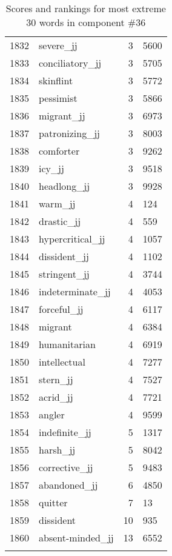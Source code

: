 \begin{longtable}[!htbp]{| rlr@{.}l |}
    1832 & severe\_jj & 3 & 5600 \\
    1833 & conciliatory\_jj & 3 & 5705 \\
    1834 & skinflint & 3 & 5772 \\
    1835 & pessimist & 3 & 5866 \\
    1836 & migrant\_jj & 3 & 6973 \\
    1837 & patronizing\_jj & 3 & 8003 \\
    1838 & comforter & 3 & 9262 \\
    1839 & icy\_jj & 3 & 9518 \\
    1840 & headlong\_jj & 3 & 9928 \\
    1841 & warm\_jj & 4 & 124 \\
    1842 & drastic\_jj & 4 & 559 \\
    1843 & hypercritical\_jj & 4 & 1057 \\
    1844 & dissident\_jj & 4 & 1102 \\
    1845 & stringent\_jj & 4 & 3744 \\
    1846 & indeterminate\_jj & 4 & 4053 \\
    1847 & forceful\_jj & 4 & 6117 \\
    1848 & migrant & 4 & 6384 \\
    1849 & humanitarian & 4 & 6919 \\
    1850 & intellectual & 4 & 7277 \\
    1851 & stern\_jj & 4 & 7527 \\
    1852 & acrid\_jj & 4 & 7721 \\
    1853 & angler & 4 & 9599 \\
    1854 & indefinite\_jj & 5 & 1317 \\
    1855 & harsh\_jj & 5 & 8042 \\
    1856 & corrective\_jj & 5 & 9483 \\
    1857 & abandoned\_jj & 6 & 4850 \\
    1858 & quitter & 7 & 13 \\
    1859 & dissident & 10 & 935 \\
    1860 & absent-minded\_jj & 13 & 6552 \\
    \hline
    \caption{Scores and rankings for most extreme 30 words in component \#36} \\
\end{longtable}
